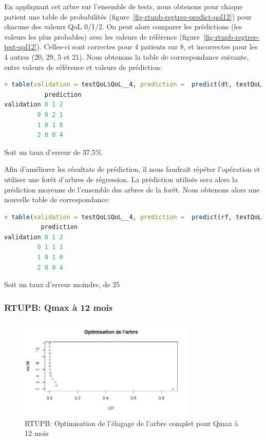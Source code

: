 En appliquant cet arbre sur l'ensemble de tests, nous obtenons pour chaque patient une table de probabilités (figure~\ref{fig-rtupb-regtree-predict-qol12}) pour chacune des valeurs QoL 0/1/2. On peut alors comparer les prédictions (les valeurs les plus probables) avec les valeurs de référence (figure~\ref{fig-rtupb-regtree-test-qol12}). Celles-ci sont correctes pour 4 patients sur 8, et incorrectes pour les 4 autres (20, 29, 5 et 21). Nous obtenons la table de correspondance suivante, entre valeurs de référence et valeurs de prédiction:

\begin{lstlisting}[language=R]
> table(validation = testQoL$QoL__4, prediction =  predict(dt, testQoL, type="class"))
           prediction
validation 0 1 2
         0 0 2 1
         1 0 1 0
         2 0 0 4
\end{lstlisting}
Soit un taux d'erreur de 37,5\%.

Afin d'améliorer les résultats de prédiction, il nous faudrait répéter l'opération et utiliser une forêt d'arbres de régression. La prédiction utilisée sera alors la prédiction moyenne de l'ensemble des arbres de la forêt. Nous obtenons alors une nouvelle table de correspondance:

\begin{lstlisting}[language=R]
> table(validation = testQoL$QoL__4, prediction =  predict(rf, testQoL))
          prediction
validation 0 1 2
         0 1 1 1
         1 0 1 0
         2 0 0 4
\end{lstlisting}
Soit un taux d'erreur moindre, de 25%


\subsubsection{RTUPB: Qmax à 12 mois}

\begin{figure}[H]
\centering
\includegraphics[width=0.75\textwidth]{../Fig/RTUPB/rtupb-regtree-optim-qmax12.png}
\caption{RTUPB: Optimisation de l'élagage de l'arbre complet pour Qmax à 12 mois}
\label{fig-rtupb-regtree-optim-qmax12}
\end{figure}

